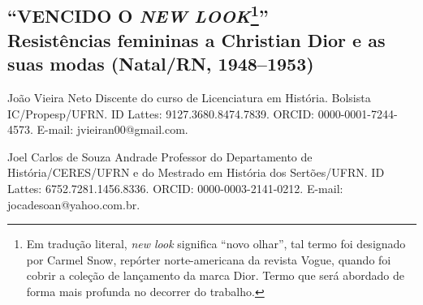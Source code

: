 \begin{refsection}
    \renewcommand{\thefigure}{\arabic{figure}}
    
    \chapter[“Vencido o {\itshape New Look}”: {\itshape resistências femininas a Christian Dior e as suas modas (Natal/RN, 1948--1953)}]{``VENCIDO O {\itshape NEW LOOK}\footnote{Em tradução literal, \textit{new look} significa ``novo olhar'', tal termo foi designado por Carmel Snow, repórter norte-americana da revista Vogue, quando foi cobrir a coleção de lançamento da marca Dior. Termo que será abordado de forma mais profunda no decorrer do trabalho.}''\\Resistências femininas a Christian Dior e as suas modas (Natal/RN, 1948--1953)}

    \label{chap:vencidonewlook}
    
    \articleAuthor
    {João Vieira Neto}
    {Discente do curso de Licenciatura em História. Bolsista IC/Propesp/UFRN. ID Lattes: 9127.3680.8474.7839. ORCID: 0000-0001-7244-4573. E-mail: jvieiran00@gmail.com.}

    \articleAuthor
    {Joel Carlos de Souza Andrade}
    {Professor do Departamento de História/CERES/UFRN e do Mestrado em História dos Sertões/UFRN. ID Lattes: 6752.7281.1456.8336. ORCID: 0000-0003-2141-0212. E-mail: jocadesoan@yahoo.com.br.}
    

\end{refsection}
